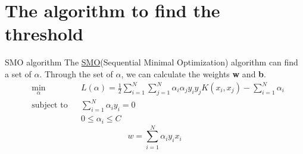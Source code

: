 \documentclass[10pt]{beamer}
\begin{document}
\section{The algorithm to find the threshold}


\begin{frame}{SMO algorithm}
The \href{https://www.microsoft.com/en-us/research/wp-content/uploads/2016/02/tr-98-14.pdf}{SMO}(Sequential Minimal Optimization) algorithm can find a set of $\alpha$.
Through the set of $ \alpha $, we can calculate the weights \textbf{w} and \textbf{b}.
\begin{equation}
    \begin{aligned}
   & \underset{\alpha}{\min}&&L(\alpha)=\frac{1}{2}\sum_{i=1}^{N}\sum_{j=1}^{N}
    \alpha_i\alpha_jy_iy_jK(x_i,x_j)-\sum_{i=1}^{N}\alpha_i \\
   & \text{subject to} &&\sum_{i=1}^{N}\alpha_iy_i=0 \\
   & && 0 \leq\alpha_i\leq C 
    \end{aligned}
    \label{Cons_cond}
\end{equation}
\begin{equation}
 w =\sum_{i=1}^N\alpha_i y_ix_i
 \end{equation}
\end{frame}
\end{document}
